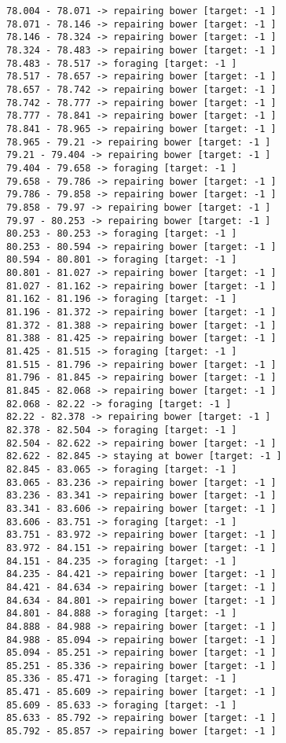 \documentclass[11pt]{article}
\begin{document}
\begin{Verbatim}[commandchars=\\\{\}]
78.004 - 78.071 -> repairing bower [target: -1 ]
78.071 - 78.146 -> repairing bower [target: -1 ]
78.146 - 78.324 -> repairing bower [target: -1 ]
78.324 - 78.483 -> repairing bower [target: -1 ]
78.483 - 78.517 -> foraging [target: -1 ]
78.517 - 78.657 -> repairing bower [target: -1 ]
78.657 - 78.742 -> repairing bower [target: -1 ]
78.742 - 78.777 -> repairing bower [target: -1 ]
78.777 - 78.841 -> repairing bower [target: -1 ]
78.841 - 78.965 -> repairing bower [target: -1 ]
78.965 - 79.21 -> repairing bower [target: -1 ]
79.21 - 79.404 -> repairing bower [target: -1 ]
79.404 - 79.658 -> foraging [target: -1 ]
79.658 - 79.786 -> repairing bower [target: -1 ]
79.786 - 79.858 -> repairing bower [target: -1 ]
79.858 - 79.97 -> repairing bower [target: -1 ]
79.97 - 80.253 -> repairing bower [target: -1 ]
80.253 - 80.253 -> foraging [target: -1 ]
80.253 - 80.594 -> repairing bower [target: -1 ]
80.594 - 80.801 -> foraging [target: -1 ]
80.801 - 81.027 -> repairing bower [target: -1 ]
81.027 - 81.162 -> repairing bower [target: -1 ]
81.162 - 81.196 -> foraging [target: -1 ]
81.196 - 81.372 -> repairing bower [target: -1 ]
81.372 - 81.388 -> repairing bower [target: -1 ]
81.388 - 81.425 -> repairing bower [target: -1 ]
81.425 - 81.515 -> foraging [target: -1 ]
81.515 - 81.796 -> repairing bower [target: -1 ]
81.796 - 81.845 -> repairing bower [target: -1 ]
81.845 - 82.068 -> repairing bower [target: -1 ]
82.068 - 82.22 -> foraging [target: -1 ]
82.22 - 82.378 -> repairing bower [target: -1 ]
82.378 - 82.504 -> foraging [target: -1 ]
82.504 - 82.622 -> repairing bower [target: -1 ]
82.622 - 82.845 -> staying at bower [target: -1 ]
82.845 - 83.065 -> foraging [target: -1 ]
83.065 - 83.236 -> repairing bower [target: -1 ]
83.236 - 83.341 -> repairing bower [target: -1 ]
83.341 - 83.606 -> repairing bower [target: -1 ]
83.606 - 83.751 -> foraging [target: -1 ]
83.751 - 83.972 -> repairing bower [target: -1 ]
83.972 - 84.151 -> repairing bower [target: -1 ]
84.151 - 84.235 -> foraging [target: -1 ]
84.235 - 84.421 -> repairing bower [target: -1 ]
84.421 - 84.634 -> repairing bower [target: -1 ]
84.634 - 84.801 -> repairing bower [target: -1 ]
84.801 - 84.888 -> foraging [target: -1 ]
84.888 - 84.988 -> repairing bower [target: -1 ]
84.988 - 85.094 -> repairing bower [target: -1 ]
85.094 - 85.251 -> repairing bower [target: -1 ]
85.251 - 85.336 -> repairing bower [target: -1 ]
85.336 - 85.471 -> foraging [target: -1 ]
85.471 - 85.609 -> repairing bower [target: -1 ]
85.609 - 85.633 -> foraging [target: -1 ]
85.633 - 85.792 -> repairing bower [target: -1 ]
85.792 - 85.857 -> repairing bower [target: -1 ]

\end{Verbatim}
\end{document}
